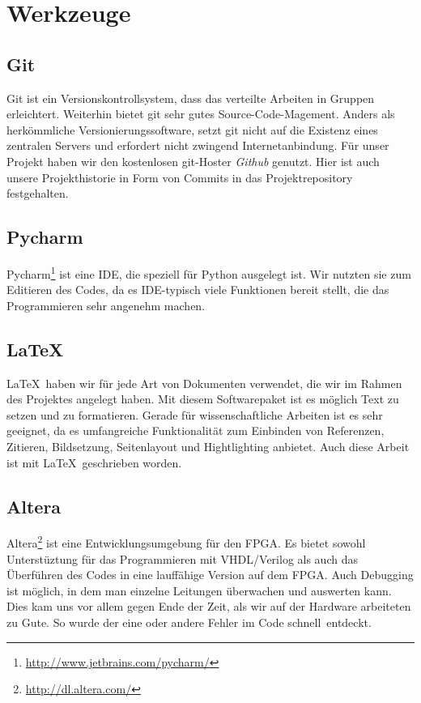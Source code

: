 \section{Werkzeuge}
\subsection{Git}
Git ist ein Versionskontrollsystem, dass das verteilte Arbeiten in Gruppen erleichtert. Weiterhin bietet git sehr gutes Source-Code-Magement. Anders als herkömmliche Versionierungssoftware, setzt git nicht auf die Existenz eines zentralen Servers und erfordert nicht zwingend Internetanbindung.
Für unser Projekt haben wir den kostenlosen git-Hoster \textit{Github} genutzt. Hier ist auch unsere Projekthistorie in Form von Commits in das Projektrepository festgehalten.

\subsection{Pycharm}
Pycharm\footnote{\url{http://www.jetbrains.com/pycharm/}} ist eine IDE, die speziell für Python ausgelegt ist. Wir nutzten sie zum Editieren des Codes, da es IDE-typisch viele Funktionen bereit stellt, die das Programmieren sehr angenehm machen.

\subsection{\LaTeX}
\LaTeX \ haben wir für jede Art von Dokumenten verwendet, die wir im Rahmen des Projektes angelegt haben. Mit diesem Softwarepaket ist es möglich Text zu setzen und zu formatieren. Gerade für wissenschaftliche Arbeiten ist es sehr geeignet, da es umfangreiche Funktionalität zum Einbinden von Referenzen, Zitieren, Bildsetzung, Seitenlayout und Hightlighting anbietet. Auch diese Arbeit ist mit \LaTeX \ geschrieben worden.

\subsection{Altera}
Altera\footnote{\url{http://dl.altera.com/}} ist eine Entwicklungsumgebung für den FPGA. Es bietet sowohl Unterstüztung für das Programmieren mit VHDL/Verilog als auch das Überführen des Codes in eine lauffähige Version auf dem FPGA. Auch Debugging ist möglich, in dem man einzelne Leitungen überwachen und auswerten kann. Dies kam uns vor allem gegen Ende der Zeit, als wir auf der Hardware arbeiteten zu Gute. So wurde der eine oder andere Fehler im Code \glqq schnell\grqq \ entdeckt. 

